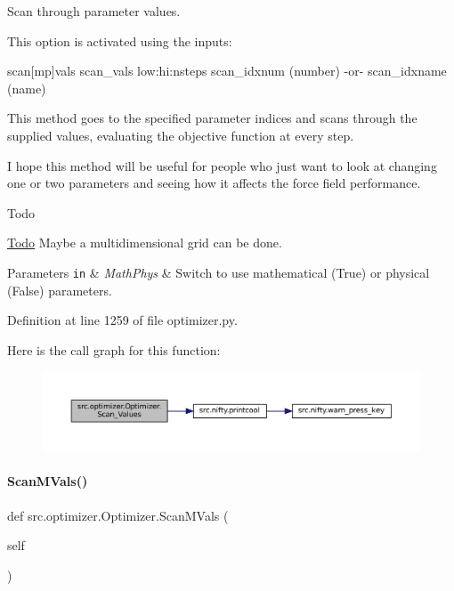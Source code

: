 Scan through parameter values. 

This option is activated using the inputs\+:


\begin{DoxyCode}
scan[mp]vals
scan\_vals low:hi:nsteps
scan\_idxnum (number) -\textcolor{keywordflow}{or}-
scan\_idxname (name)
\end{DoxyCode}


This method goes to the specified parameter indices and scans through the supplied values, evaluating the objective function at every step.

I hope this method will be useful for people who just want to look at changing one or two parameters and seeing how it affects the force field performance.

\begin{DoxyRefDesc}{Todo}
\item[\hyperlink{todo__todo000013}{Todo}]Maybe a multidimensional grid can be done. \end{DoxyRefDesc}

\begin{DoxyParams}[1]{Parameters}
\mbox{\tt in}  & {\em Math\+Phys} & Switch to use mathematical (True) or physical (False) parameters. \\
\hline
\end{DoxyParams}


Definition at line 1259 of file optimizer.\+py.

Here is the call graph for this function\+:
\nopagebreak
\begin{figure}[H]
\begin{center}
\leavevmode
\includegraphics[width=350pt]{classsrc_1_1optimizer_1_1Optimizer_a98e20ccc6c2d2cf5f6c611a0441e14bb_cgraph}
\end{center}
\end{figure}
\mbox{\label{classsrc_1_1optimizer_1_1Optimizer_a23cdd9fad58bbc9a6f5659ed3bbededc}} 
\paragraph{\texorpdfstring{Scan\+M\+Vals()}{ScanMVals()}}
{\footnotesize\ttfamily def src.\+optimizer.\+Optimizer.\+Scan\+M\+Vals (\begin{DoxyParamCaption}\item[{}]{self }\end{DoxyParamCaption})}



